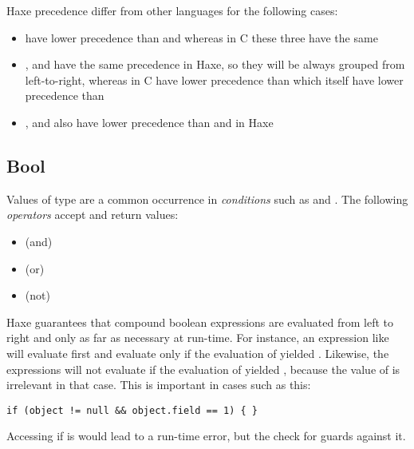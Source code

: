 Haxe precedence differ from other languages for the following cases:
\begin{itemize}
	\item \expr{\%} have lower precedence than \expr{*} and \expr{/} whereas in C these three have the same
	\item \expr{|}, \expr{\&} and \expr{\^} have the same precedence in Haxe, so they will be always grouped from left-to-right, whereas in C \expr{\&} have lower precedence than \expr{\^} which itself have lower precedence than \expr{|}
	\item \expr{|}, \expr{\&} and \expr{\^} also have lower precedence than \expr{==} and \expr{!=} in Haxe
\end{itemize}

\subsection{Bool}
\label{types-bool}


Values of type  are a common occurrence in \emph{conditions} such as  and . The following \emph{operators} accept and return  values:

\begin{itemize}
	\item \expr{\&\&} (and)
	\item \expr{||} (or)
	\item \expr{!} (not)
\end{itemize}

Haxe guarantees that compound boolean expressions are evaluated from left to right and only as far as necessary at run-time. For instance, an expression like  will evaluate  first and evaluate  only if the evaluation of  yielded . Likewise, the expressions  will not evaluate  if the evaluation of  yielded , because the value of  is irrelevant in that case. This is important in cases such as this:

\begin{lstlisting}
if (object != null && object.field == 1) { }
\end{lstlisting}

Accessing  if  is  would lead to a run-time error, but the check for  guards against it.




